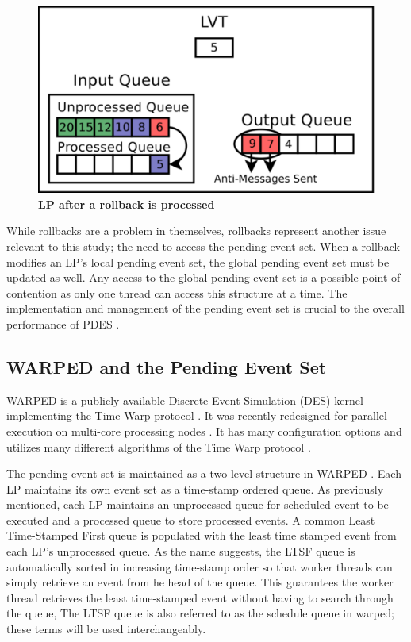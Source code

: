 \documentclass[a4paper]{article}
\begin{document}
\begin{figure}[H]
    \centering
    \graphicspath{ {./figures/} }
    \includegraphics[width=\textwidth,height=\textheight,keepaspectratio]{rollback_processed}
    \caption{\textbf{LP after a rollback is processed}}
    \label{fig:rollback_processed}
\end{figure}

While rollbacks are a problem in themselves, rollbacks represent another issue
relevant to this study; the need to access the pending event set.  When a
rollback modifies an LP's local pending event set, the global pending event set
must be updated as well.  Any access to the global pending event set is a
possible point of contention as only one thread can access this structure at a
time.  The implementation and management of the pending event set is crucial to
the overall performance of PDES \cite{twpes}.  

\subsection{\textbf{WARPED and the Pending Event Set}}

WARPED is a publicly available Discrete Event Simulation (DES) kernel
implementing the Time Warp protocol \cite{martin,fujimoto}.  It was recently
redesigned for parallel execution on multi-core processing nodes
\cite{muthalagu}.  It has many configuration options and utilizes many different
algorithms of the Time Warp protocol \cite{fujimoto}.
\par

The pending event set is maintained as a two-level structure in WARPED
\cite{dickman}.  Each LP maintains its own event set as a time-stamp ordered
queue.  As previously mentioned, each LP maintains an unprocessed queue for
scheduled event to be executed and a processed queue to store processed events.  
A common Least Time-Stamped First queue is populated with the least time
stamped event from each LP's unprocessed queue.  As the name suggests, the LTSF
queue is automatically sorted in increasing time-stamp order so that worker
threads can simply retrieve an event from he head of the queue.  This guarantees
the worker thread retrieves the least time-stamped event without having to
search through the queue,  The LTSF queue is also referred to as the schedule
queue in warped; these terms will be used interchangeably.
\par
\end{document}
